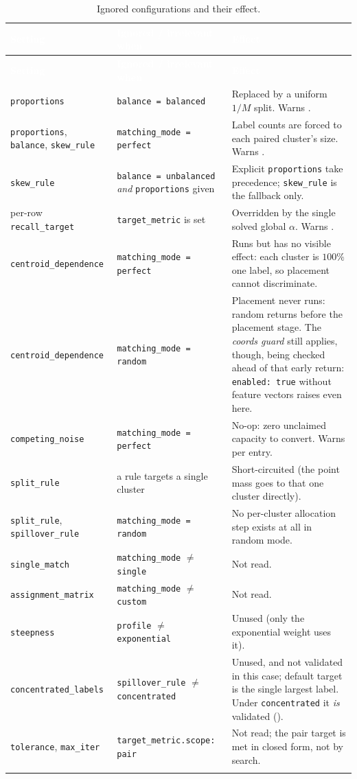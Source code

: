 \documentclass[a4paper,11pt]{article}
\newcommand{\vcode}[1]{\textcolor{valred}{\bfseries\ttfamily #1}}
\newcommand{\wcode}[1]{\textcolor{warnamber}{\bfseries\ttfamily #1}}
\newcommand{\headrow}{\rowcolor{headblue}}
\newcommand{\hc}[1]{\textcolor{white}{\bfseries #1}}
\begin{document}
\begin{longtable}{@{}L{4.2cm} L{5.4cm} L{6.0cm}@{}}
\toprule
\headrow \hc{Setting} & \hc{Ignored / irrelevant when} & \hc{Effect} \\
\midrule
\endfirsthead
\headrow \hc{Setting} & \hc{Ignored / irrelevant when} & \hc{Effect} \\ \midrule
\endhead
\texttt{proportions} & \texttt{balance = balanced} & Replaced by a uniform $1/M$ split. Warns \wcode{301}. \\
\texttt{proportions}, \texttt{balance}, \texttt{skew\_rule} & \texttt{matching\_mode = perfect} & Label counts are forced to each paired cluster's size. Warns \wcode{302}. \\
\texttt{skew\_rule} & \texttt{balance = unbalanced} \emph{and} \texttt{proportions} given & Explicit \texttt{proportions} take precedence; \texttt{skew\_rule} is the fallback only. \\
per-row \texttt{recall\_target} & \texttt{target\_metric} is set & Overridden by the single solved global $\alpha$. Warns \wcode{303}. \\
\texttt{centroid\_dependence} & \texttt{matching\_mode = perfect} & Runs but has no visible effect: each cluster is $100\%$ one label, so placement cannot discriminate. \\
\texttt{centroid\_dependence} & \texttt{matching\_mode = random} & Placement never runs: random returns before the placement stage. The \emph{coords guard} still applies, though, being checked ahead of that early return: \texttt{enabled: true} without feature vectors raises \vcode{125} even here. \\
\texttt{competing\_noise} & \texttt{matching\_mode = perfect} & No-op: zero unclaimed capacity to convert. Warns \wcode{305} per entry. \\
\texttt{split\_rule} & a rule targets a single cluster & Short-circuited (the point mass goes to that one cluster directly). \\
\texttt{split\_rule}, \texttt{spillover\_rule} & \texttt{matching\_mode = random} & No per-cluster allocation step exists at all in random mode. \\
\texttt{single\_match} & \texttt{matching\_mode} $\neq$ \texttt{single} & Not read. \\
\texttt{assignment\_matrix} & \texttt{matching\_mode} $\neq$ \texttt{custom} & Not read. \\
\texttt{steepness} & \texttt{profile} $\neq$ \texttt{exponential} & Unused (only the exponential weight uses it). \\
\texttt{concentrated\_labels} & \texttt{spillover\_rule} $\neq$ \texttt{concentrated} & Unused, and not validated in this case; default target is the single largest label. Under \texttt{concentrated} it \emph{is} validated (\vcode{128}). \\
\texttt{tolerance}, \texttt{max\_iter} & \texttt{target\_metric.scope: pair} & Not read; the pair target is met in closed form, not by search. \\
\bottomrule
\caption{Ignored configurations and their effect.}
\end{longtable}
\newpage
\end{document}
